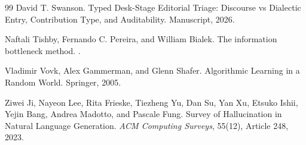 \documentclass[11pt]{article}
\theoremstyle{definition}
\theoremstyle{remark}
\begin{document}
\begin{thebibliography}{99}
David T. Swanson.
\newblock Typed Desk-Stage Editorial Triage: Discourse vs Dialectic Entry, Contribution Type, and Auditability.
\newblock Manuscript, 2026.

Naftali Tishby, Fernando C. Pereira, and William Bialek.
\newblock The information bottleneck method.
.

Vladimir Vovk, Alex Gammerman, and Glenn Shafer.
\newblock Algorithmic Learning in a Random World.
\newblock Springer, 2005.

Ziwei Ji, Nayeon Lee, Rita Frieske, Tiezheng Yu, Dan Su, Yan Xu, Etsuko Ishii, Yejin Bang, Andrea Madotto, and Pascale Fung.
\newblock Survey of Hallucination in Natural Language Generation.
\newblock \emph{ACM Computing Surveys}, 55(12), Article 248, 2023.

\end{thebibliography}
\end{document}
